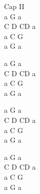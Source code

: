 \begin{chord}
    Cap II\\
    a G a\\
    C D CD a\\
    a C G\\
    a G a

    a G a\\
    C D CD a\\
    a C G\\
    a G a

    a G a\\
    C D CD a\\
    a C G\\
    a G a

    a G a\\
    C D CD a\\
    a C G\\
    a G a
\end{chord}